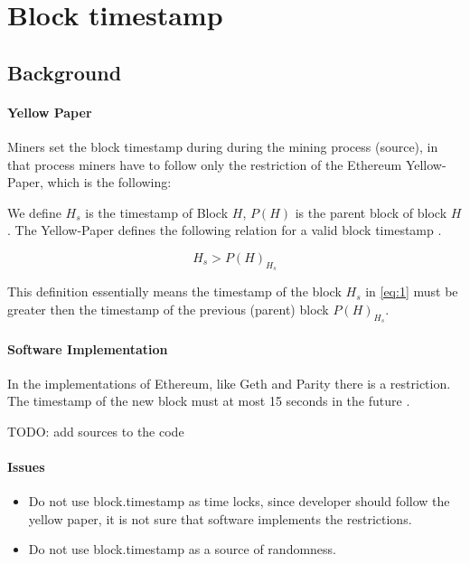 \section{Block timestamp}

\subsection{Background}


\paragraph{Yellow Paper}

Miners set the block timestamp during during the mining process (source), in
that process miners have to follow only the restriction of the Ethereum
Yellow-Paper, which is the following:

We define $H_s$ is the timestamp of Block $H$, $P(H)$ is the parent
block of block $H$. The Yellow-Paper defines the following relation for a valid
block timestamp \cite{ethyellowpaper2023}.

\begin{equation} \label{eq:1}
H_s > P(H)_{H_s}
\end{equation}

This definition essentially means the timestamp of the block $H_s$ in
\ref{eq:1} must be greater then the timestamp of the previous (parent) block
$P(H)_{H_s}$.

\paragraph{Software Implementation}

In the implementations of Ethereum, like Geth and Parity there is a
restriction. The timestamp of the new block must at most 15 seconds in the
future \cite{Conkas2021}. \newline

TODO: add sources to the code

\paragraph{Issues}

\begin{itemize}
\item Do not use block.timestamp as time locks, since developer should follow the yellow paper, it is not sure that software implements the restrictions.
\item Do not use block.timestamp as a source of randomness.
\end{itemize}


